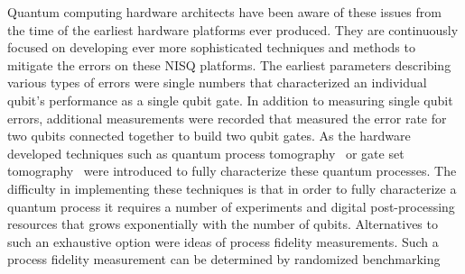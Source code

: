 \documentclass[main.tex]{subfiles}
\begin{document}
Quantum computing hardware architects have been aware of these issues from the time of the earliest hardware platforms ever produced.  They are continuously focused on developing ever more sophisticated techniques and methods to mitigate the errors on these NISQ platforms.  The earliest parameters describing various types of errors were single numbers that characterized an individual qubit’s performance as a single qubit gate.  In addition to measuring single qubit errors, additional measurements were recorded that measured the error rate for two qubits connected together to build two qubit gates.  As the hardware developed techniques such as 
quantum process tomography~\cite{ref:Chuang1997} or gate set tomography~\cite{ref:Merkel2012,ref:Blume-Kohout2013,ref:Blume-Kohout2017} were introduced to fully characterize these quantum processes.  The difficulty in implementing these techniques is that in order to fully characterize a quantum process it requires a number of experiments and digital post-processing resources that grows exponentially with the number of qubits.  Alternatives to such an exhaustive option were ideas of process fidelity measurements.  Such a process fidelity measurement can be determined by randomized benchmarking ~\cite{ref:Emerson2005,ref:Dankert2009,ref:Magesan2011} 
\end{document}
